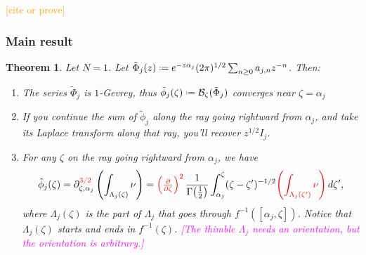 \documentclass{article}
\theoremstyle{definition}
\newcommand{\series}[1]{\tilde{#1}}
\newcommand{\fracderiv}[3]{\partial^{#1}_{#2, #3}}
\newcommand*{\defeq}{\mathrel{\vcenter{\baselineskip0.5ex \lineskiplimit0pt
                     \hbox{\scriptsize.}\hbox{\scriptsize.}}}%
                     =}
\newcommand{\borel}{\mathcal{B}}
\theoremstyle{plain}
\newtheorem{theorem}{Theorem}[section]
\begin{document}
\textcolor{orange}{[cite or prove]}

\subsubsection{Main result}
\begin{theorem}\label{thm:maxim-dim} Let $N=1$. Let $\tilde{\Phi}_{j}(z)\defeq e^{-z\alpha_j}(2\pi)^{1/2} \sum_{n\geq 0}a_{j,n}z^{-n}$. Then:
\begin{enumerate}
\item\label{int:series-gevrey} The series $\tilde{\Phi}_j$ is $1$-Gevrey, thus $\series{\phi}_j(\zeta)\defeq\borel_\zeta(\tilde{\Phi}_j)$ converges near $\zeta=\alpha_j$
\item\label{int:resum-valid} If you continue the sum of $\tilde{\phi}_j$ along the ray going rightward from $\alpha_j$, and take its Laplace transform along that ray, you'll recover $z^{1/2} I_j$.
\item\label{int:deriv-formula} For any $\zeta$ on the ray going rightward from $\alpha_j$, we have
\begin{multline}\label{formula1}
\hat{\phi}_{j}(\zeta)=\fracderiv{\textcolor{red}{3/2}}{\zeta} {\alpha_j} \left( \int_{\Lambda_j(\zeta)}\nu \right)=\textcolor{red}{\left(\tfrac{\partial}{\partial \zeta}\right)^2}\,\frac{1}{\Gamma\big(\tfrac{1}{2}\big)} \int_{\alpha_j}^\zeta (\zeta-\zeta')^{-1/2} \textcolor{red}{\left( \int_{\Lambda_j(\zeta')} \nu \right)}\,d\zeta',
\end{multline}
where $\Lambda_j(\zeta)$ is the part of $\Lambda_j$ that goes through $f^{-1}([\alpha_j, \zeta])$. Notice that $\Lambda_j(\zeta)$ starts and ends in $f^{-1}(\zeta)$. \textcolor{magenta}{[The thimble $\Lambda_j$ needs an orientation, but the orientation is arbitrary.]}
\end{enumerate}
\end{theorem}
\end{document}
